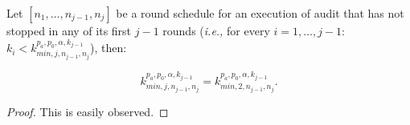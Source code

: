 \begin{lemma}\label{lemma:markov}
Let $[n_1, \ldots, n_{j-1}, n_j]$ be a round schedule for an execution of \Providence audit that has not stopped
in any of its first $j-1$ rounds (\textit{i.e.,} for every $i = 1, \ldots, j-1$:
$k_i < k^{p_a, p_0, \alpha, k_{j-1}}_{min, j, n_{j-1}, n_j} $), then: 

\[ 
k^{p_a, p_0, \alpha, k_{j-1}}_{min, j, n_{j-1}, n_j} = k^{p_a, p_0, \alpha, k_{j-1}}_{min, 2, n_{j-1}, n_j} .
\]
\end{lemma}
\begin{proof}
This is easily observed. 
\end{proof}

